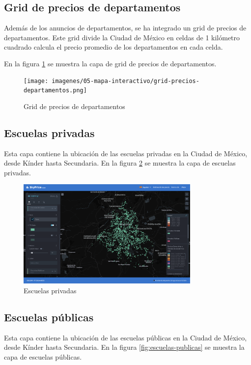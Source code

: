 \subsection{Grid de precios de departamentos}
Además de los anuncios de departamentos, se ha integrado un grid de precios de
departamentos. Este grid divide la Ciudad de México en celdas de 1 kilómetro cuadrado
calcula el precio promedio de los departamentos en cada celda.

En la figura \ref{fig:grid-precios-departamentos} se muestra la capa de grid de
precios de departamentos.

\begin{figure}[H]
    \centering
    \texttt{[image: imagenes/05-mapa-interactivo/grid-precios-departamentos.png]}
    \caption{Grid de precios de departamentos}
    \label{fig:grid-precios-departamentos}
\end{figure}

\subsection{Escuelas privadas}
Esta capa contiene la ubicación de las escuelas privadas en la Ciudad de México,
desde Kínder hasta Secundaria. En la figura \ref{fig:escuelas-privadas} se muestra
la capa de escuelas privadas.

\begin{figure}[H]
    \centering
    \includegraphics[width=0.8\textwidth]{imagenes/05-mapa-interactivo/escuelas-privadas.png}
    \caption{Escuelas privadas}
    \label{fig:escuelas-privadas}
\end{figure}

\subsection{Escuelas públicas}
Esta capa contiene la ubicación de las escuelas públicas en la Ciudad de México,
desde Kínder hasta Secundaria. En la figura \ref{fig:escuelas-publicas} se muestra
la capa de escuelas públicas.

